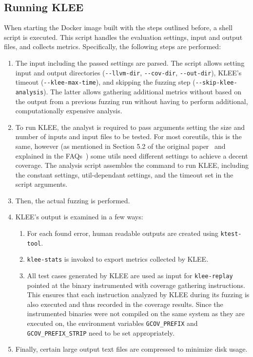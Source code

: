 \documentclass{article}
\let\savedCite=\cite
\renewcommand{\cite}{\unskip~\savedCite}
\begin{document}
\subsection{Running KLEE}
\label{analyze.sh}
When starting the Docker image built with the steps outlined before, a shell script is executed. This script handles the evaluation settings, input and output files, and collects metrics. Specifically, the following steps are performed:

\begin{enumerate}
    \item The input including the passed settings are parsed. The script allows setting input and output directories (\lstinline{--llvm-dir}, \lstinline{--cov-dir}, \lstinline{--out-dir}), KLEE's timeout (\lstinline{--klee-max-time}), and skipping the fuzzing step (\lstinline{--skip-klee-analysis}). The latter allows gathering additional metrics without based on the output from a previous fuzzing run without having to perform additional, computationally expensive analysis.
    \item To run KLEE, the analyst is required to pass arguments setting the size and number of inputs and input files to be tested. For most coreutils, this is the same, however (as mentioned in Section 5.2 of the original paper\cite{KLEE} and explained in the FAQs\cite{KLEEFAQ}) some utils need different settings to achieve a decent coverage. The analysis script assembles the command to run KLEE, including the constant settings, util-dependant settings, and the timeout set in the script arguments.
    \item Then, the actual fuzzing is performed.
    \item KLEE's output is examined in a few ways:
          \begin{enumerate}
              \item For each found error, human readable outputs are created using \lstinline{ktest-tool}.
              \item \lstinline{klee-stats} is invoked to export metrics collected by KLEE.
              \item All test cases generated by KLEE are used as input for \lstinline{klee-replay} pointed at the binary instrumented with coverage gathering instructions. This ensures that each instruction analyzed by KLEE during its fuzzing is also executed and thus recorded in the coverage results. Since the instrumented binaries were not compiled on the same system as they are executed on, the environment variables \lstinline{GCOV_PREFIX} and \lstinline{GCOV_PREFIX_STRIP} need to be set appropriately.
          \end{enumerate}
    \item Finally, certain large output text files are compressed to minimize disk usage.
\end{enumerate}
\end{document}
